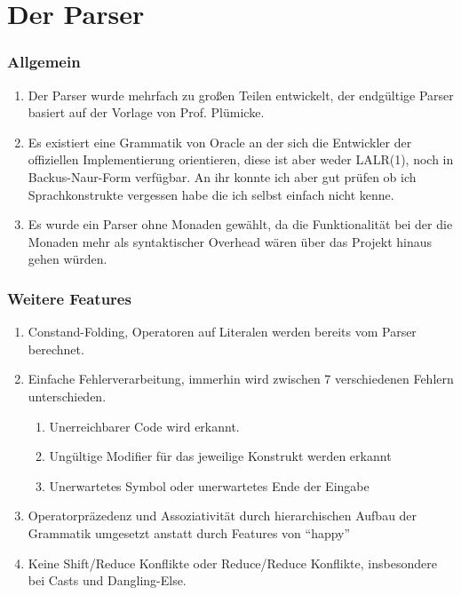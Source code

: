 \documentclass{beamer}
\begin{document}
  \section{Der Parser}
  \frame{\tableofcontents[currentsection]}
  \begin{frame} %
    \frametitle{Allgemein} %
    \begin{enumerate}
      \item Der Parser wurde mehrfach zu großen Teilen entwickelt, der endgültige Parser basiert auf der Vorlage von Prof. Plümicke.
      \item Es existiert eine Grammatik von Oracle an der sich die Entwickler der offiziellen Implementierung orientieren, diese ist aber weder LALR(1), noch in Backus-Naur-Form verfügbar. An ihr konnte ich aber gut prüfen ob ich Sprachkonstrukte vergessen habe die ich selbst einfach nicht kenne. 
      \item Es wurde ein Parser ohne Monaden gewählt, da die Funktionalität bei der die Monaden mehr als syntaktischer Overhead wären über das Projekt hinaus gehen würden.
    \end{enumerate}
  \end{frame}
  \begin{frame} %
    \frametitle{Weitere Features} %
    \begin{enumerate}
      \item Constand-Folding, Operatoren auf Literalen werden bereits vom Parser berechnet.
      \item Einfache Fehlerverarbeitung, immerhin wird zwischen 7 verschiedenen Fehlern unterschieden.
      \begin{enumerate}
       \item Unerreichbarer Code wird erkannt.
       \item Ungültige Modifier für das jeweilige Konstrukt werden erkannt
       \item Unerwartetes Symbol oder unerwartetes Ende der Eingabe
      \end{enumerate}
      \item Operatorpräzedenz und Assoziativität durch hierarchischen Aufbau der Grammatik umgesetzt anstatt durch Features von ``happy'' 
      \item Keine Shift/Reduce Konflikte oder Reduce/Reduce Konflikte, insbesondere bei Casts und Dangling-Else.
    \end{enumerate}
  \end{frame}
\end{document}
